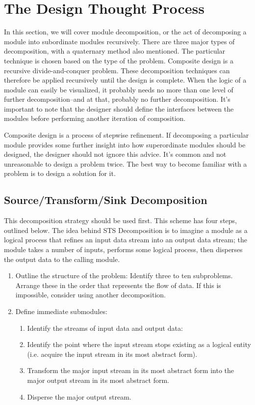 \documentclass[format.tex]{subfiles}
\begin{document}
\section{The Design Thought Process}
In this section, we will cover module decomposition, or the act of decomposing
a module into subordinate modules recursively. There are three major types of
decomposition, with a quaternary method also mentioned. The particular
technique is chosen based on the type of the problem. Composite design is a
recursive divide-and-conquer problem. These decomposition techniques can
therefore be applied recursively until the design is complete. When the logic
of a module can easily be visualized, it probably needs no more than one level
of further decomposition--and at that, probably no further decomposition. It's
important to note that the designer should define the interfaces between the
modules before performing another iteration of composition.

Composite design is a process of stepwise refinement. If decomposing a
particular module provides some further insight into how superordinate modules
should be designed, the designer should not ignore this advice. It's common and
not unreasonable to design a problem twice. The best way to become familiar
with a problem is to design a solution for it.

\subsection{Source/Transform/Sink Decomposition}
This decomposition strategy should be used first. This scheme has four steps,
outlined below. The idea behind STS Decomposition is to imagine a module as a
logical process that refines an input data stream into an output data stream;
the module takes a number of inputs, performs some logical process, then
disperses the output data to the calling module.
\begin{enumerate}
\item Outline the structure of the problem:
  Identify three to ten subproblems. Arrange these in the order that represents
  the flow of data. If this is impossible, consider using another
  decomposition.
\item Define immediate submodules:
  \begin{enumerate}
  \item Identify the streams of input data and output data:
  \item Identify the point where the input stream stops existing as a logical
    entity (i.e. acquire the input stream in its most abstract form).
  \item Transform the major input stream in its most abstract form into the
    major output stream in its most abstract form.
  \item Disperse the major output stream.
  \end{enumerate}
\end{enumerate}
\end{document}
